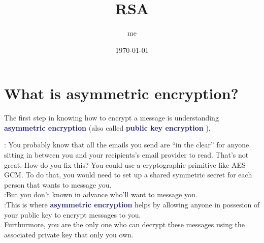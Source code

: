 \documentclass[dvipsnames]{article}
\title{RSA}
\date{\today}
\author{me}
\newcommand{\mycola}{MidnightBlue}
\newcommand{\Cola}[1]{\textcolor{\mycola}{\textbf{#1}}}
\begin{document}
\maketitle

\section{What is asymmetric encryption?}

The first step in knowing how to encrypt a message is understanding \Cola{
  asymmetric encryption} (also called \Cola{public key encryption} ).

  : You probably know that all the emails you send are ``in the clear'' for anyone
sitting in between you and your recipients's email provider to read. That's not
great. How do you fix this? You could use a cryptographic primitive like
AES-GCM. To do that, you would need to set up a shared symmetric secret for each
person that wants to message you.\\
  :But you don't known in advance who'll want to message you.\\
  :This is where \Cola{ asymmetric encryption} helps by allowing anyone in
possesion of your public key to encrypt messages to you.\\
Furthurmore, you are the only one who can decrypt these messages using the
associated private key that only you own.
\end{document}
